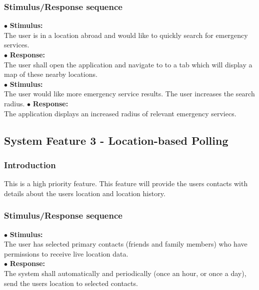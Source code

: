 \documentclass{scrreprt}
\begin{document}
\subsubsection{Stimulus/Response sequence}
\vspace{4mm}
	$\bullet$ \textbf{Stimulus:} \\ \hspace{5mm} The user is in a location abroad and would like to quickly search for emergency services. \\
	$\bullet$ \textbf{Response:} \\ \hspace{5mm} The user shall open the application and navigate to to a tab which will display a map of these nearby locations.
\vspace{4mm}\\
	\hspace{-4.75mm} $\bullet$ \textbf{Stimulus:} \\ \hspace{5mm} The user would like more emergency service results. The user increases the search radius.
	$\bullet$ \textbf{Response:} \\ \hspace{5mm} The application displays an increased radius of relevant emergency serviecs.
	
\subsection{System Feature 3 - Location-based Polling}
\subsubsection{Introduction}
This is a high priority feature. This feature will provide the users contacts with details about the users location and location history.


\subsubsection{Stimulus/Response sequence}
\vspace{4mm}
	$\bullet$ \textbf{Stimulus:} \\ \hspace{5mm} The user has selected primary contacts (friends and family members) who have permissions to receive live location data. \\
	$\bullet$ \textbf{Response:} \\ \hspace{5mm} The system shall automatically and periodically (once an hour, or once a day), send the users location to selected contacts.
\end{document}
